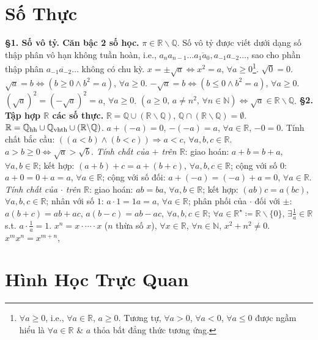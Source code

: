 \documentclass{article}
\numberwithin{equation}{section}
\begin{document}
\section{Số Thực}
\textbf{\S1. Số vô tỷ. Căn bậc 2 số học.} $\pi\in\mathbb{R}\backslash\mathbb{Q}$. Số vô tỷ được viết dưới dạng số thập phân vô hạn không tuần hoàn, i.e., $\overline{a_na_{n-1}\ldots a_1a_0,a_{-1}a_{-2}\ldots}$, sao cho phần thập phân $\overline{a_{-1}a_{-2}\ldots}$ không có chu kỳ. $x = \pm\sqrt{a}\Leftrightarrow x^2 = a$, $\forall a\ge 0$\footnote{$\forall a\ge 0$, i.e., $\forall a\in\mathbb{R}$, $a\ge 0$. Tương tự, $\forall a > 0$, $\forall a < 0$, $\forall a\le 0$ được ngầm hiểu là $\forall a\in\mathbb{R}$ \& $a$ thỏa bất đẳng thức tương ứng.}. $\sqrt{0} = 0$. $\sqrt{a} = b\Leftrightarrow(b\ge 0\land b^2 = a)$, $\forall a\ge 0$. $-\sqrt{a} = b\Leftrightarrow(b\le 0\land b^2 = a)$, $\forall a\ge 0$. $(\sqrt{a})^2 = (-\sqrt{a})^2 = a$, $\forall a\ge 0$. $(a\ge 0,\,a\ne n^2,\,\forall n\in\mathbb{N})\Leftrightarrow\sqrt{a}\in\mathbb{R}\backslash\mathbb{Q}$. \textbf{\S2. Tập hợp $\mathbb{R}$ các số thực.} $\mathbb{R} = \mathbb{Q}\cup(\mathbb{R}\backslash\mathbb{Q})$, $\mathbb{Q}\cap(\mathbb{R}\backslash\mathbb{Q}) = \emptyset$. $\mathbb{R} = \mathbb{Q}_{\rm hh}\cup\mathbb{Q}_{\rm vhth}\cup(\mathbb{R}\backslash\mathbb{Q})$. $a + (-a) = 0$, $-(-a) = a$, $\forall a\in\mathbb{R}$, $-0 = 0$. Tính chất bắc cầu: $((a < b)\land(b < c))\Rightarrow a < c$, $\forall a,b,c\in\mathbb{R}$. $a > b\ge 0\Leftrightarrow\sqrt{a} > \sqrt{b}$. \textit{Tính chất của $+$ trên $\mathbb{R}$}: giao hoán: $a + b = b + a$, $\forall a,b\in\mathbb{R}$; kết hợp: $(a + b) + c = a + (b + c)$, $\forall a,b,c\in\mathbb{R}$; cộng với số $0$: $a + 0 = 0 + a = a$, $\forall a\in\mathbb{R}$; cộng với số đối: $a + (-a) = (-a) + a = 0$, $\forall a\in\mathbb{R}$. \textit{Tính chất của $\cdot$ trên $\mathbb{R}$}: giao hoán: $ab = ba$, $\forall a,b\in\mathbb{R}$; kết hợp: $(ab)c = a(bc)$, $\forall a,b,c\in\mathbb{R}$; nhân với số $1$: $a\cdot 1 = 1a = a$, $\forall a\in\mathbb{R}$; phân phối của $\cdot$ đối với $\pm$: $a(b + c) = ab + ac$, $a(b - c) = ab - ac$, $\forall a,b,c\in\mathbb{R}$; $\forall a\in\mathbb{R}^\star\coloneqq\mathbb{R}\backslash\{0\}$, $\exists\frac{1}{a}\in\mathbb{R}$ s.t. $a\cdot\frac{1}{a} = 1$. $x^n = x\cdot\cdots\cdot x$ ($n$ thừa số $x$), $\forall x\in\mathbb{R}$, $\forall n\in\mathbb{N}$, $x^2 + n^2\ne 0$. $x^mx^n = x^{m + n}$, 


\section{Hình Học Trực Quan}
\end{document}
